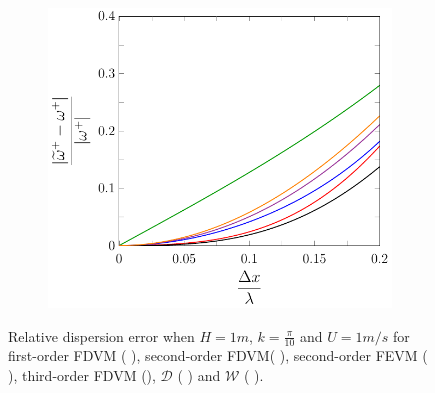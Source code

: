 \begin{figure}
\begin{subfigure}{0.5\textwidth}
	\end{subfigure}
	\par\bigskip
	\begin{subfigure}{0.5\textwidth}
		\includegraphics[width=\textwidth]{./chp4/figures/New/Dispu1Shall.pdf}
	\end{subfigure}
	\caption{Relative dispersion error when $H = 1m$, $k = \frac{\pi}{10}$ and $U = 1 m/s$ for first-order FDVM ({\color{green!60!black} \solidrule}), second-order FDVM({\color{red} \solidrule}), second-order FEVM ({\color{blue} \solidrule}), third-order FDVM ({\solidrule}), $\mathcal{D}$ ({\color{violet!80!white} \solidrule}) and $\mathcal{W}$ ({\color{orange} \solidrule}).}
	\label{fig:Dispu1Shall}
\end{figure}

